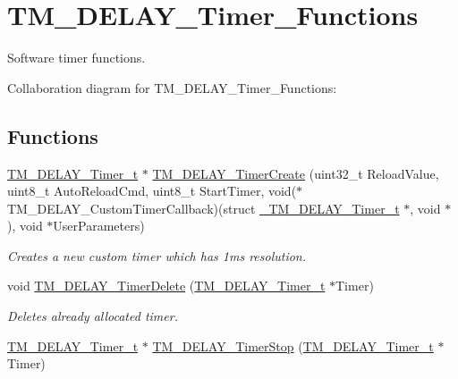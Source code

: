 \hypertarget{group___t_m___d_e_l_a_y___timer___functions}{}\section{T\+M\+\_\+\+D\+E\+L\+A\+Y\+\_\+\+Timer\+\_\+\+Functions}
\label{group___t_m___d_e_l_a_y___timer___functions}


Software timer functions.  


Collaboration diagram for T\+M\+\_\+\+D\+E\+L\+A\+Y\+\_\+\+Timer\+\_\+\+Functions\+:
\subsection*{Functions}
\begin{DoxyCompactItemize}
\item 
\hyperlink{group___t_m___d_e_l_a_y___typedefs_gaf0beeb077a757f34c8b176464d9a0e85}{T\+M\+\_\+\+D\+E\+L\+A\+Y\+\_\+\+Timer\+\_\+t} $\ast$ \hyperlink{group___t_m___d_e_l_a_y___timer___functions_ga848f0e5f378dc5c28b3a5a0a86153118}{T\+M\+\_\+\+D\+E\+L\+A\+Y\+\_\+\+Timer\+Create} (uint32\+\_\+t Reload\+Value, uint8\+\_\+t Auto\+Reload\+Cmd, uint8\+\_\+t Start\+Timer, void($\ast$T\+M\+\_\+\+D\+E\+L\+A\+Y\+\_\+\+Custom\+Timer\+Callback)(struct \hyperlink{struct___t_m___d_e_l_a_y___timer__t}{\+\_\+\+T\+M\+\_\+\+D\+E\+L\+A\+Y\+\_\+\+Timer\+\_\+t} $\ast$, void $\ast$), void $\ast$User\+Parameters)
\begin{DoxyCompactList}\small\item\em Creates a new custom timer which has 1ms resolution. \end{DoxyCompactList}\item 
void \hyperlink{group___t_m___d_e_l_a_y___timer___functions_ga396cc635fa4700caebd8a756ce9197a3}{T\+M\+\_\+\+D\+E\+L\+A\+Y\+\_\+\+Timer\+Delete} (\hyperlink{group___t_m___d_e_l_a_y___typedefs_gaf0beeb077a757f34c8b176464d9a0e85}{T\+M\+\_\+\+D\+E\+L\+A\+Y\+\_\+\+Timer\+\_\+t} $\ast$Timer)
\begin{DoxyCompactList}\small\item\em Deletes already allocated timer. \end{DoxyCompactList}\item 
\hyperlink{group___t_m___d_e_l_a_y___typedefs_gaf0beeb077a757f34c8b176464d9a0e85}{T\+M\+\_\+\+D\+E\+L\+A\+Y\+\_\+\+Timer\+\_\+t} $\ast$ \hyperlink{group___t_m___d_e_l_a_y___timer___functions_ga860e1fa6c7ae18b54d89425ccbd280a5}{T\+M\+\_\+\+D\+E\+L\+A\+Y\+\_\+\+Timer\+Stop} (\hyperlink{group___t_m___d_e_l_a_y___typedefs_gaf0beeb077a757f34c8b176464d9a0e85}{T\+M\+\_\+\+D\+E\+L\+A\+Y\+\_\+\+Timer\+\_\+t} $\ast$Timer)

\end{DoxyCompactItemize}
